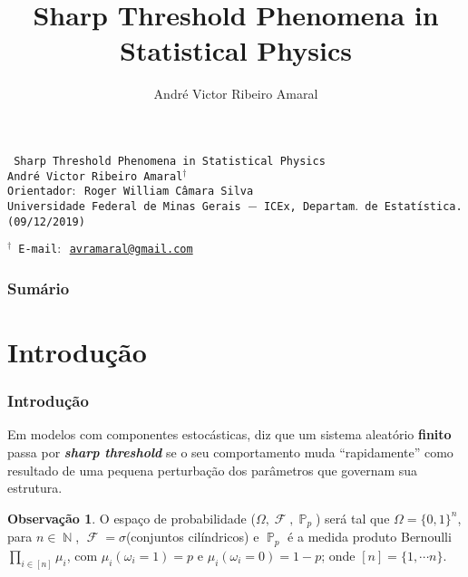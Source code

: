 \documentclass[12pt]{beamer}
\title{Sharp Threshold Phenomena in Statistical Physics}
\author[André V. R. Amaral]{André Victor Ribeiro Amaral}
\theoremstyle{definition} %
\newtheorem*{myobs*}{Observação}
\DeclareMathOperator{\PX}{\mathbb{P}} %
\DeclareMathOperator{\FX}{\mathcal{F}} %
\DeclareMathOperator{\NX}{\mathbb{N}} %
\begin{document}
	\AtBeginSection{} %
	
	\begin{frame}[t]
		\centering
		\vspace{42pt}
		\texttt{{ Sharp Threshold Phenomena in Statistical Physics}} \\
		\vspace{30pt}
		\texttt{{\small André Victor Ribeiro Amaral${}^{\dagger}$}} \\
		\texttt{{\scriptsize Orientador$:$ Roger William Câmara Silva}}\\
		\vspace{30pt}
		\texttt{{\scriptsize Universidade Federal de Minas Gerais $-$ ICEx, Departam$.$ de Estatística.}}\\
		\texttt{{\scriptsize (09/12/2019)}} \\
		\vspace{24pt}
		\begin{flushleft} \texttt{{\tiny ${}^{\dagger}$ E-mail$:$ \href{mailto:avramaral@gmail.com}{avramaral@gmail.com}}} \end{flushleft}
		
	\end{frame}

	\begin{frame}[t]
		\frametitle{Sumário}
		\tableofcontents
	\end{frame}

	\section{Introdução}
	\begin{frame}[t]
		\frametitle{Introdução}	
			Em modelos com componentes estocásticas, diz que um sistema aleatório \textbf{finito} passa por \textbf{\emph{sharp threshold}} se o seu comportamento muda ``rapidamente'' como resultado de uma pequena perturbação dos parâmetros que governam sua estrutura.
		\pause
		\vspace{12pt}
		\begin{myobs*}
			O espaço de probabilidade ($\Omega, \FX, \PX_p$) será tal que $\Omega = \{0,1\}^n$, para $n \in \NX$, $\FX = \sigma$(conjuntos cilíndricos) e $\PX_p$ é a medida produto Bernoulli $\prod_{i \in [n]} \mu_i$, com $\mu_i(\omega_i = 1) = p$ e $\mu_i(\omega_i = 0) = 1-p$; onde $[n] = \{1, \cdots n\}$.
		\end{myobs*}
	\end{frame}
\end{document}
